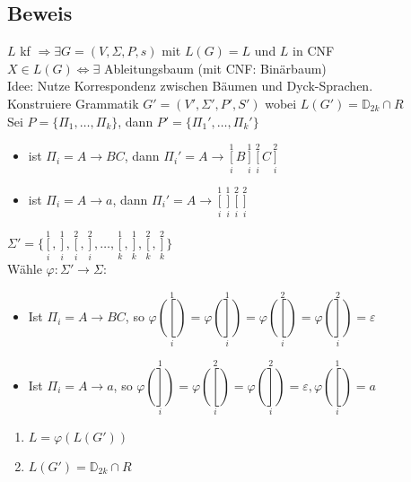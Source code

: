     \subsection{Beweis}
        $L$ kf $\Rightarrow\exists G=(V,\Sigma,P,s)$ mit $L(G)=L$ und $L$ in CNF\\
        $X\in L(G)\Leftrightarrow\exists$ Ableitungsbaum (mit CNF: Binärbaum)\\
        Idee: Nutze Korrespondenz zwischen Bäumen und Dyck-Sprachen.\\\vspace{2mm}
        Konstruiere Grammatik $G'=(V',\Sigma',P',S')$ wobei $L(G')=\mathds{D}_{2k}\cap R$\\
        Sei $P=\{\Pi_1,\dots,\Pi_k\}$, dann $P'=\{\Pi_1',\dots,\Pi_k'\}$
        \begin{itemize}
            \item ist $\Pi_i=A\rightarrow BC$, dann $\Pi_i'=A\rightarrow\mathop{[}\limits_i^1B\mathop{]}\limits_i^1\mathop{[}\limits_i^2C\mathop{]}\limits_i^2$
            \item ist $\Pi_i=A\rightarrow a$, dann $\Pi_i'=A\rightarrow\mathop{[}\limits_i^1\mathop{]}\limits_i^1\mathop{[}\limits_i^2\mathop{]}\limits_i^2$
        \end{itemize}
        $\Sigma'=\{\mathop{[}\limits_i^1,\mathop{]}\limits_i^1,\mathop{[}\limits_i^2,\mathop{]}\limits_i^2,\dots,\mathop{[}\limits_k^1,\mathop{]}\limits_k^1,\mathop{[}\limits_k^2,\mathop{]}\limits_k^2\}$\\
        Wähle $\varphi:\Sigma'\rightarrow\Sigma$:
        \begin{itemize}
            \item Ist $\Pi_i=A\rightarrow BC$, so $\varphi(\mathop{[}\limits_i^1)=\varphi(\mathop{]}\limits_i^1)=\varphi(\mathop{[}\limits_i^2)=\varphi(\mathop{]}\limits_i^2)=\varepsilon$
            \item Ist $\Pi_i=A\rightarrow a$, so $\varphi(\mathop{]}\limits_i^1)=\varphi(\mathop{[}\limits_i^2)=\varphi(\mathop{]}\limits_i^2)=\varepsilon,\varphi(\mathop{[}\limits_i^1)=a$
        \end{itemize}
        \begin{enumerate}[1)]
            \item $L=\varphi(L(G'))$
            \item $L(G')=\mathds{D}_{2k}\cap R$
        \end{enumerate}
